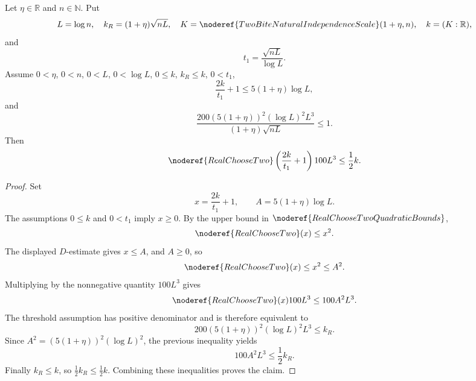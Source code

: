 \begin{helper}
Let \(\eta\in\mathbb R\) and \(n\in\mathbb N\).  Put
\[
L=\log n,\quad
k_R=(1+\eta)\sqrt{nL},\quad
K=\noderef{TwoBiteNaturalIndependenceScale}(1+\eta,n),\quad k=(K:\mathbb R),
\]
and
\[
t_1=\frac{\sqrt{nL}}{\log L}.
\]
Assume \(0<\eta\), \(0<n\), \(0<L\), \(0<\log L\), \(0\le k\),
\(k_R\le k\), \(0<t_1\),
\[
\frac{2k}{t_1}+1\le5(1+\eta)\log L,
\]
and
\[
\frac{200(5(1+\eta))^2(\log L)^2L^3}
{(1+\eta)\sqrt{nL}}\le1.
\]
Then
\[
\noderef{RealChooseTwo}\left(\frac{2k}{t_1}+1\right)100L^3
\le\frac12k.
\]
\end{helper}
\begin{proof}
Set
\[
x=\frac{2k}{t_1}+1,\qquad A=5(1+\eta)\log L.
\]
The assumptions \(0\le k\) and \(0<t_1\) imply \(x\ge0\).  By the upper
bound in \(\noderef{RealChooseTwoQuadraticBounds}\),
\[
\noderef{RealChooseTwo}(x)\le x^2.
\]
The displayed \(D\)-estimate gives \(x\le A\), and \(A\ge0\), so
\[
\noderef{RealChooseTwo}(x)\le x^2\le A^2.
\]
Multiplying by the nonnegative quantity \(100L^3\) gives
\[
\noderef{RealChooseTwo}(x)100L^3\le 100A^2L^3.
\]
The threshold assumption has positive denominator and is therefore equivalent
to
\[
200(5(1+\eta))^2(\log L)^2L^3\le k_R.
\]
Since \(A^2=(5(1+\eta))^2(\log L)^2\), the previous inequality yields
\[
100A^2L^3\le\frac12 k_R.
\]
Finally \(k_R\le k\), so \(\frac12k_R\le\frac12k\).  Combining these
inequalities proves the claim.
\end{proof}
